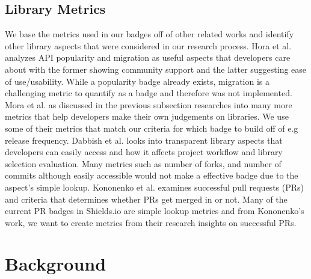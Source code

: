 \documentclass[12pt, letterpaper]{article}
\begin{document}
\subsection{Library Metrics}
We base the metrics used in our badges off of other related works and identify other library aspects
that were considered in our research process.
Hora et al. \cite{apiwave} analyzes API popularity and migration as useful aspects that developers care about
with the former showing community support and the latter suggesting ease of use/usability. 
While a popularity badge already exists, migration is a challenging metric to quantify as a badge and therefore
was not implemented.
Mora et al. \cite{metrics, empiricalmetrics} as discussed in the previous subsection researches into
many more metrics that help developers make their own judgements on libraries. We use some of their metrics
that match our criteria for which badge to build off of e.g release frequency. 
Dabbish et al. \cite{transparency} looks into transparent library aspects that developers can easily access
and how it affects project workflow and library selection evaluation. Many metrics such as number of forks,
and number of commits although easily accessible would not make a effective badge \cite{githubbadges}
due to the aspect's simple lookup. 
Kononenko et al. \cite{shopifyarticle} examines successful pull requests (PRs) and criteria that determines
whether PRs get merged in or not. Many of the current PR badges in Shields.io \cite{shields}
are simple lookup metrics and from Kononenko's work, we want
to create metrics from their research insights on successful PRs.

\section{Background}
\end{document}
